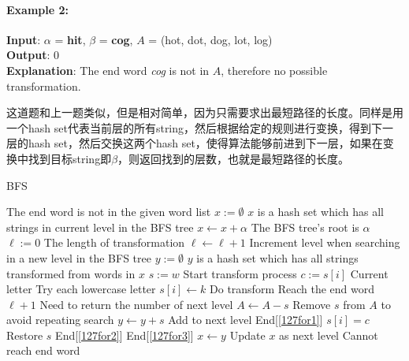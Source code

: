 \paragraph{Example 2:}
\begin{flushleft}
\textbf{Input}: $\alpha$ = \textbf{hit},  $\beta$ = \textbf{cog}, $A$ = (hot, dot, dog, lot, log)
\\
\textbf{Output}: 0
\\
\textbf{Explanation}: The end word \textit{cog} is not in $A$, therefore no possible transformation.
\end{flushleft}
\begin{CJK*}{UTF8}{gbsn}
这道题和上一题类似，但是相对简单，因为只需要求出最短路径的长度。同样是用一个hash set代表当前层的所有string，然后根据给定的规则进行变换，得到下一层的hash set，然后交换这两个hash set，使得算法能够前进到下一层，如果在变换中找到目标string即$\beta$，则返回找到的层数，也就是最短路径的长度。
\end{CJK*}
\setcounter{algorithm}{0}
\begin{algorithm}[H]
\caption{BFS}
\begin{algorithmic}[1]
 \Comment The end word is not in the given word list
\State {}
\EndIf
\State $x:=\emptyset$ \Comment $x$ is a hash set which has all strings in current level in the BFS tree
\State $x\gets x+\alpha$ \Comment The BFS tree's root is $\alpha$
\State $\ell:=0$ \Comment The length of transformation
\State $\ell\gets \ell +1$ \Comment Increment level when searching in a new level in the BFS tree
\State $y:=\emptyset$ \Comment $y$ is a hash set which has all strings transformed from words in $x$
 \label{127for3}
\State $s:=w$
 \Comment Start transform process \label{127for2}
\State $c:=s[i]$ \Comment Current letter 
 \Comment Try each lowercase letter \label{127for1}
\State $s[i]\gets k$ \Comment Do transform
 \Comment Reach the end word
\State \Return $\ell +1$ \Comment Need to return the number of next level
\EndIf
\State $A\gets A- s$ \Comment Remove $s$ from $A$ to avoid repeating search
\State $y\gets y+s$ \Comment Add to next level
\EndFor \Comment End[\ref{127for1}]
\State $s[i] = c$ \Comment Restore $s$
\EndFor \Comment End[\ref{127for2}]
\EndFor \Comment End[\ref{127for3}]
\State $x\gets y$ \Comment Update $x$ as next level
\EndWhile
\State {} \Comment Cannot reach end word
\EndProcedure
\end{algorithmic}
\end{algorithm}